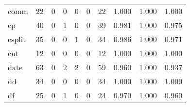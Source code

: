 \begin{longtable}{lp{1.3cm}p{1.3cm}p{1.3cm}p{1.3cm}p{1.3cm}p{1.3cm}p{1.3cm}p{1.3cm}p{1.3cm}}
comm      &                     22 &                                             0 &                                            0 &                                           0 &                                            0 &                                         22 &                                1.000 &                                  1.000 &                                1.000 \\
cp        &                     40 &                                             0 &                                            1 &                                           0 &                                            0 &                                         39 &                                0.981 &                                  1.000 &                                0.975 \\
csplit    &                     35 &                                             0 &                                            0 &                                           1 &                                            0 &                                         34 &                                0.986 &                                  1.000 &                                0.971 \\
cut       &                     12 &                                             0 &                                            0 &                                           0 &                                            0 &                                         12 &                                1.000 &                                  1.000 &                                1.000 \\
date      &                     63 &                                             0 &                                            2 &                                           2 &                                            0 &                                         59 &                                0.960 &                                  1.000 &                                0.937 \\
dd        &                     34 &                                             0 &                                            0 &                                           0 &                                            0 &                                         34 &                                1.000 &                                  1.000 &                                1.000 \\
df        &                     25 &                                             0 &                                            1 &                                           0 &                                            0 &                                         24 &                                0.970 &                                  1.000 &                                0.960 \\

\end{longtable}
